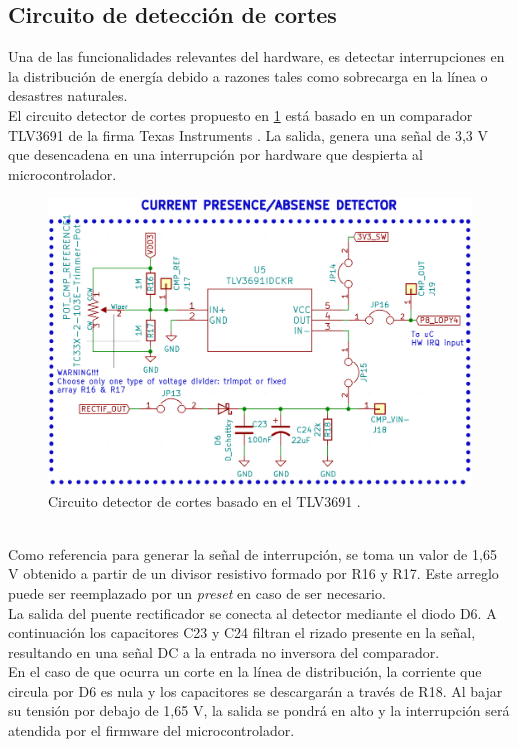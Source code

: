  \subsection{Circuito de detección de cortes}
 Una de las funcionalidades relevantes del hardware, es detectar interrupciones en la distribución de energía debido a razones tales como sobrecarga en la línea o desastres naturales.\\
 El circuito detector de cortes propuesto en \ref{fig:ctodetectorcortes} está basado en un comparador TLV3691 de la firma Texas Instruments \citep{tlv3691}. La salida, genera una señal de 3,3 V que desencadena en una interrupción por hardware que despierta al microcontrolador.\\
 \begin{figure}[h]
 	\centering
 	\includegraphics[width=0.9\linewidth]{Figures/cto_detector_cortes}
 	\caption{Circuito detector de cortes basado en el TLV3691 \citep{tlv3691}.}
 	\label{fig:ctodetectorcortes}
 \end{figure}\\
 Como referencia para generar la señal de interrupción, se toma un valor de 1,65 V obtenido a partir de un divisor resistivo formado por R16 y R17. Este arreglo puede ser reemplazado por un \textit{preset} en caso de ser necesario.\\
 La salida del puente rectificador se conecta al detector mediante el diodo D6. A continuación los capacitores C23 y C24 filtran el rizado presente en la señal, resultando en una señal DC a la entrada no inversora del comparador.\\
 En el caso de que ocurra un corte en la línea de distribución, la corriente que circula por D6 es nula y los capacitores se descargar\'{a}n a través de R18. Al bajar su tensión por debajo de 1,65 V, la salida se pondrá en alto y la interrupción será atendida por el firmware del microcontrolador.\\
 

